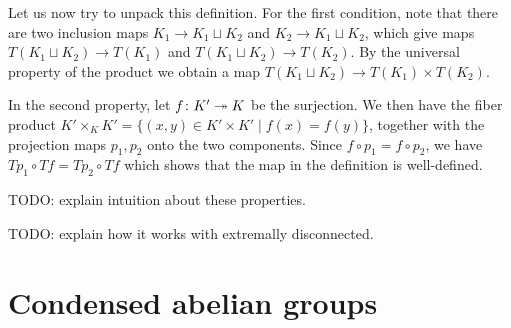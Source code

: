 \documentclass{article}
\begin{document}
Let us now try to unpack this definition.
For the first condition, note that there are two inclusion maps
$K_1 \to K_1 \sqcup K_2$ and $K_2 \to K_1 \sqcup K_2$, which give
maps $T(K_1 \sqcup K_2) \to T(K_1)$ and $T(K_1 \sqcup K_2) \to T(K_2)$.
By the universal property of the product we obtain a map
$T(K_1 \sqcup K_2) \to T(K_1) \times T(K_2)$.

In the second property, let $f\colon K' \twoheadrightarrow K$ be the surjection.
We then have the fiber product $K' \times_K K' = \{(x,y)\in K' \times K' \mid f(x) = f(y)\}$,
together with the projection maps $p_1, p_2$ onto the two components.
Since $f\circ p_1 = f \circ p_2$, we have $Tp_1 \circ Tf = Tp_2 \circ Tf$
which shows that the map in the definition is well-defined.

TODO: explain intuition about these properties.
\begin{prop}
    \label{prop:compactly_generated_adjunction}
\end{prop}

TODO: explain how it works with extremally disconnected.
\section{Condensed abelian groups}


\end{document}
